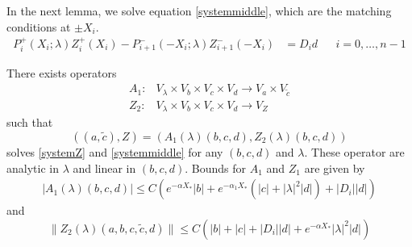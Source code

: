 \documentclass[thesis.tex]{subfiles}
\begin{document}
In the next lemma, we solve equation \eqref{systemmiddle}, which are the matching conditions at $\pm X_i$.
\begin{align*}
P_i^+(X_i; \lambda) Z_i^+(X_i) - P_{i+1}^-(-X_i; \lambda) Z_{i+1}^-(-X_i) &= D_i d && i = 0, \dots, n-1
\end{align*}

\begin{lemma}\label{Zinv1}
There exists operators
\begin{align*}
A_1: &V_\lambda \times V_b \times V_c \times V_d \rightarrow V_a \times V_{\tilde{c}} \\
Z_2: &V_\lambda \times V_b \times V_c \times V_d \rightarrow V_Z
\end{align*}
such that 
\[
((a, \tilde{c}), Z) = (A_1(\lambda)(b, c, d), Z_2(\lambda)(b,c,d))
\]
solves \eqref{systemZ} and \eqref{systemmiddle} for any $(b, c, d)$ and $\lambda$. These operator are analytic in $\lambda$ and linear in $(b, c, d)$. Bounds for $A_1$ and $Z_1$ are given by
\begin{align}\label{A1bound}
|A_1(\lambda)(b, c, d)| \leq C \left( e^{-\alpha X_*} |b|  + e^{-\alpha_1 X_*}(|c| + |\lambda|^2 |d|) + |D_i||d| \right)
\end{align} 
and
\begin{equation}\label{Z2bound}
\| Z_2(\lambda)(a,b,c,\tilde{c},d) \| \leq C\left(|b| + |c| + |D_i||d| + e^{-\alpha X_*}|\lambda|^2|d|\right)
\end{equation}


\end{lemma}
\end{document}
